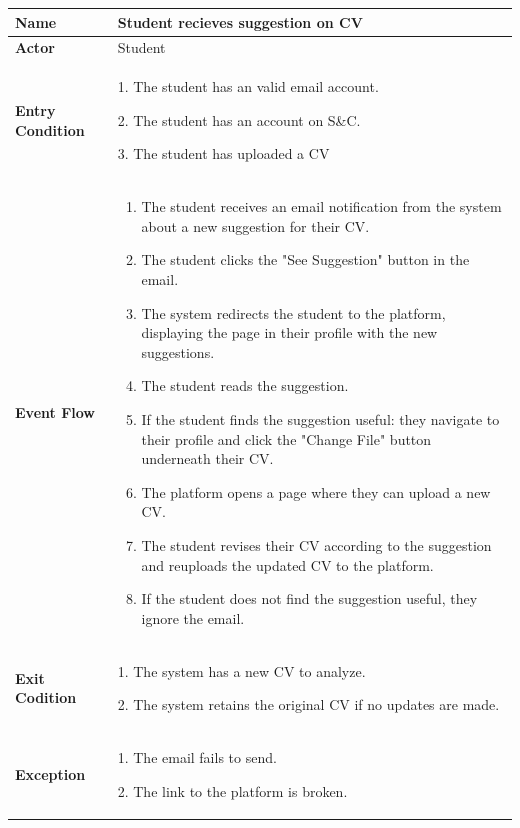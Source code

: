 \begin{longtable}{|p{}|p{}|}
\hline
\textbf{Name} &  Student recieves suggestion on CV\\
\hline
\textbf{Actor} &  Student\\
\hline
\textbf{Entry Condition} &  
1. The student has an valid email account.

2. The student has an account on S\&C. 

3. The student has uploaded a CV\\
\hline
\textbf{Event Flow} &  
\begin{enumerate}
    \item The student receives an email notification from the system about a new suggestion for their CV.
    \item The student clicks the "See Suggestion" button in the email.
    \item  The system redirects the student to the platform, displaying the page in their profile with the new suggestions.
    \item The student reads the suggestion.
    \item If the student finds the suggestion useful: they navigate to their profile and click the "Change File" button underneath their CV.
    \item The platform opens a page where they can upload a new CV.
    \item The student revises their CV according to the suggestion and reuploads the updated CV to the platform.
    \item If the student does not find the suggestion useful, they ignore the email.
\end{enumerate}\\
\hline
\textbf{Exit Codition} &  
1. The system has a new CV to analyze.

2. The system retains the original CV if no updates are made.\\
\hline
\textbf{Exception} &  
1. The email fails to send.

2. The link to the platform is broken.\\
\hline
\end{longtable}

